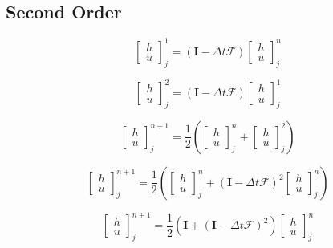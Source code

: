 \documentclass[12pt]{article}
\begin{document}
\subsection{Second Order}

\[\left[\begin{array}{c}
h \\ u
\end{array}\right]^{1}_j = \left(\boldsymbol{I} - \Delta t\boldsymbol{\mathcal{F}} \right)\left[\begin{array}{c}
h \\ u
\end{array}\right]^{n}_j  \]

\[\left[\begin{array}{c}
h \\ u
\end{array}\right]^{2}_j = \left(\boldsymbol{I} - \Delta t\boldsymbol{\mathcal{F}} \right)\left[\begin{array}{c}
h \\ u
\end{array}\right]^{1}_j  \]

\[\left[\begin{array}{c}
h \\ u
\end{array}\right]^{n+1}_j = \frac{1}{2} \left(\left[\begin{array}{c}
h \\ u
\end{array}\right]^{n}_j + \left[\begin{array}{c}
h \\ u
\end{array}\right]^{2}_j\right)  \]

\[\left[\begin{array}{c}
h \\ u
\end{array}\right]^{n+1}_j = \frac{1}{2} \left(\left[\begin{array}{c}
h \\ u
\end{array}\right]^{n}_j + \left(\boldsymbol{I} - \Delta t\boldsymbol{\mathcal{F}} \right)^2 \left[\begin{array}{c}
h \\ u
\end{array}\right]^{n}_j\right)  \]

\[\left[\begin{array}{c}
h \\ u
\end{array}\right]^{n+1}_j = \frac{1}{2} \left(\boldsymbol{I} + \left(\boldsymbol{I} - \Delta t\boldsymbol{\mathcal{F}} \right)^2 \right) \left[\begin{array}{c}
h \\ u
\end{array}\right]^{n}_j  \]
\end{document}
